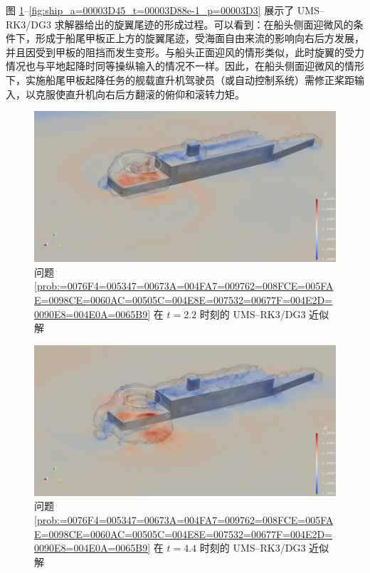 图 \ref{fig:ship_a=00003D45_t=00003D22e-1_p=00003D3}–\ref{fig:ship_a=00003D45_t=00003D88e-1_p=00003D3}
展示了 UMS–RK3/DG3 求解器给出的旋翼尾迹的形成过程。可以看到：在船头侧面迎微风的条件下，形成于船尾甲板正上方的旋翼尾迹，受海面自由来流的影响向右后方发展，并且因受到甲板的阻挡而发生变形。与船头正面迎风的情形类似，此时旋翼的受力情况也与平地起降时同等操纵输入的情况不一样。因此，在船头侧面迎微风的情形下，实施船尾甲板起降任务的舰载直升机驾驶员（或自动控制系统）需修正桨距输入，以克服使直升机向右后方翻滚的俯仰和滚转力矩。

\begin{figure}[h!]
\begin{centering}
\includegraphics[width=1\textwidth,height=0.28\textheight,keepaspectratio]{figures/ship/a=45_p=3/Frame22}
\par\end{centering}
\caption{\label{fig:ship_a=00003D45_t=00003D22e-1_p=00003D3}问题 \ref{prob:=0076F4=005347=00673A=004FA7=009762=008FCE=005FAE=0098CE=0060AC=00505C=004E8E=007532=00677F=004E2D=0090E8=004E0A=0065B9}
在 $t=2.2$ 时刻的 UMS–RK3/DG3 近似解}
\end{figure}

\begin{figure}[h!]
\begin{centering}
\includegraphics[width=1\textwidth,height=0.28\textheight,keepaspectratio]{figures/ship/a=45_p=3/Frame44}
\par\end{centering}
\caption{\label{fig:ship_a=00003D45_t=00003D44e-1_p=00003D3}问题 \ref{prob:=0076F4=005347=00673A=004FA7=009762=008FCE=005FAE=0098CE=0060AC=00505C=004E8E=007532=00677F=004E2D=0090E8=004E0A=0065B9}
在 $t=4.4$ 时刻的 UMS–RK3/DG3 近似解}
\end{figure}


